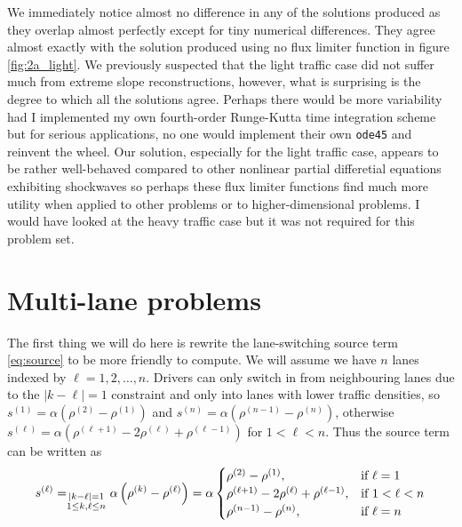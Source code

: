 \documentclass[11pt]{article}
\let\sumop\relax
\begin{document}
We immediately notice almost no difference in any of the solutions produced as they overlap almost perfectly except for tiny numerical differences. They agree almost exactly with the solution produced using no flux limiter function in figure \ref{fig:2a_light}. We previously suspected that the light traffic case did not suffer much from extreme slope reconstructions, however, what is surprising is the degree to which all the solutions agree. Perhaps there would be more variability had I implemented my own fourth-order Runge-Kutta time integration scheme but for serious applications, no one would implement their own \texttt{ode45} and reinvent the wheel. Our solution, especially for the light traffic case, appears to be rather well-behaved compared to other nonlinear partial differetial equations exhibiting shockwaves so perhaps these flux limiter functions find much more utility when applied to other problems or to higher-dimensional problems. I would have looked at the heavy traffic case but it was not required for this problem set.

\section{Multi-lane problems}
The first thing we will do here is rewrite the lane-switching source term \eqref{eq:source} to be more friendly to compute. We will assume we have $n$ lanes indexed by $\ell=1,2,\dots,n$. Drivers can only switch in from neighbouring lanes due to the $|k-\ell|=1$ constraint and only into lanes with lower traffic densities, so $s^{(1)} = \alpha \left( \rho^{(2)} - \rho^{(1)} \right)$ and $s^{(n)} = \alpha \left( \rho^{(n-1)} - \rho^{(n)} \right)$, otherwise $s^{(\ell)} = \alpha \left( \rho^{(\ell+1)} - 2\rho^{(\ell)} + \rho^{(\ell-1)} \right)$ for $1 < \ell < n$. Thus the source term can be written as 
\begin{equation} \label{eq:sourceEasy}
s^{(\ell)} = \sumop_{\substack{|k-\ell|=1 \\ 1 \le k,\ell \le n}} \alpha \left( \rho^{(k)} - \rho^{(\ell)} \right) = \alpha
\begin{cases}
  \rho^{(2)} - \rho^{(1)},& \text{if } \ell = 1 \\
  \rho^{(\ell+1)} - 2\rho^{(\ell)} + \rho^{(\ell-1)},& \text{if } 1 < \ell < n \\
  \rho^{(n-1)} - \rho^{(n)},& \text{if } \ell = n
\end{cases}
\end{equation}
\end{document}
